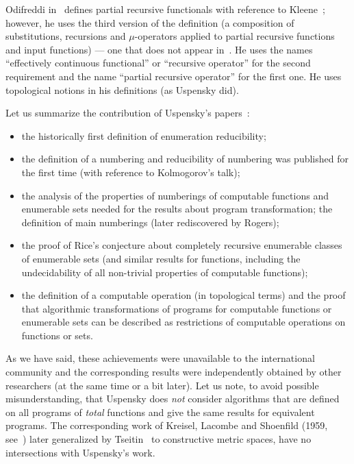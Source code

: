 \documentclass[12pt]{article}
\theoremstyle{remark}
\begin{document}
Odifreddi in~\cite[Definition II.3.6]{Odifreddi1989} defines partial recursive functionals with reference to Kleene~\cite{Kleene1957}; however, he uses the third version of the definition (a composition of substitutions, recursions and $\mu$-operators applied to partial recursive functions and input functions) --- one that does not appear in~\cite{Kleene1957}. He uses the names ``effectively continuous functional''  or ``recursive operator'' for the second requirement and the name ``partial recursive operator'' for the first one. He uses topological notions in his definitions (as Uspensky did).


Let us summarize the contribution of Uspensky's papers~\cite{1955,1955a,1956}:

\begin{itemize}
\item the historically first definition of enumeration reducibility;

\item the definition of a numbering and reducibility of numbering was published for the first time (with reference to Kolmogorov's talk);

\item the analysis of the properties of numberings of computable functions and enumerable sets needed for the results about program transformation; the definition of main numberings (later rediscovered by Rogers);

\item the proof of Rice's conjecture about completely recursive enumerable classes of enumerable sets (and similar results for functions, including the undecidability of all non-trivial properties of computable functions);
 
\item the definition of a computable operation (in topological terms) and the proof that algorithmic transformations of programs for computable functions or enumerable sets can be described as restrictions of computable operations on functions or sets.

\end{itemize}

As we have said, these achievements were unavailable to the international community and the corresponding results were independently obtained by other researchers (at the same time or a bit later). Let us note, to avoid possible misunderstanding, that Uspensky does \emph{not} consider algorithms that are defined on all programs of \emph{total} functions and give the same results for equivalent programs. The corresponding work of Kreisel, Lacombe and Shoenfild (1959, see~\cite{KreiselLacombeShoenfield1959}) later generalized by Tseitin~\cite{Tseitin1962} to constructive metric spaces, have no intersections with Uspensky's work.
\end{document}

